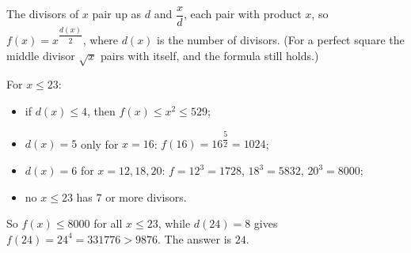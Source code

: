 The divisors of $x$ pair up as $d$ and $\dfrac xd$, each pair with product $x$, so $f(x)=x^{\dfrac{d(x)}{2}}$, where $d(x)$ is the number of divisors. (For a perfect square the middle divisor $\sqrt x$ pairs with itself, and the formula still holds.)

For $x\le23$:
\begin{itemize}
\item if $d(x)\le4$, then $f(x)\le x^2\le529$;
\item $d(x)=5$ only for $x=16$: $f(16)=16^{\dfrac52}=1024$;
\item $d(x)=6$ for $x=12,18,20$: $f=12^3=1728$, $18^3=5832$, $20^3=8000$;
\item no $x\le23$ has $7$ or more divisors.
\end{itemize}
So $f(x)\le8000$ for all $x\le23$, while $d(24)=8$ gives $f(24)=24^4=331776>9876$. The answer is $\boxed{24}$.
